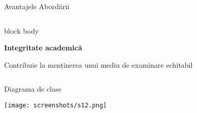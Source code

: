 \documentclass[aspectratio=169,9pt]{beamer}
\begin{document}
\begin{frame}{Avantajele Abordării}
\begin{columns}[T]
                        \vspace{0.4cm}
                        
                        \begin{beamercolorbox}[rounded=true,shadow=true,sep=1em]{block body}
                                \begin{center}
                                        {\fontsize{24}{24}\selectfont\textcolor{mainblue}{\faGraduationCap}}
                                        \vspace{0.2cm}
                                        
                                        \textbf{Integritate academică}
                                        \vspace{0.1cm}
                                        
                                        \small Contribuie la menținerea unui mediu de examinare echitabil
                                \end{center}
                        \end{beamercolorbox}
        \end{columns}
\end{frame}

\begin{frame}{Diagrama de clase}
        \begin{center}
                \texttt{[image: screenshots/s12.png]}
        \end{center}
\end{frame}
\end{document}
